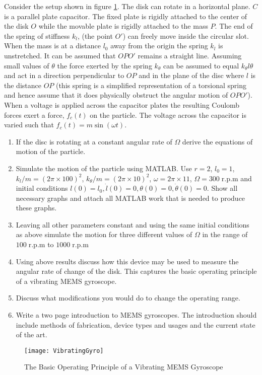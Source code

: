 \documentclass[graybox,envcountchap,sectrefs]{svmonoMuga}
\begin{document}
\begin{exercise}\label{ex:MEMSgyro}
Consider the setup shown in figure \ref{Fig:MEMSGyro}. The disk can rotate in a horizontal plane. $C$ is a parallel plate capacitor. The fixed plate is rigidly attached to the center of 
the disk $O$ while the movable plate is rigidly attached to the mass $P$. The end of the spring of stiffness $k_l$, (the point $O'$) can freely move inside the circular slot. When the 
mass is at a distance $l_0$ away from the origin the spring $k_l$ is unstretched. It can be assumed that $OPO'$ remains a straight line. Assuming small values of $\theta$ the force 
exerted by the spring $k_{\theta}$ can be assumed to equal $k_{\theta}l\theta$ and act in a direction perpendicular to $OP$ and in the plane of the disc where $l$ is the distance $OP
$ (this spring is a simplified representation of a torsional spring and hence assume that it does physically obstruct the angular motion of $OPO'$).
When a voltage is applied across the capacitor plates the resulting Coulomb forces exert a force, $f_c(t)$ on the particle. The voltage across the capacitor is varied such that 
$f_c(t)=m\sin{(\omega t)}$.

\begin{enumerate}
\item If the disc is rotating at a constant angular rate of $\Omega$ derive the equations of motion of the particle.
\item Simulate the motion of the particle using MATLAB. Use  $r=2$, $l_0=1$, $k_l/m=(2\pi\times 100)^2$, $k_{\theta}/m=(2\pi\times 10)^2$, $\omega=2\pi\times 11$, $\Omega=300\; 
\mathrm{r.p.m}$ and initial conditions $l(0)=l_0, \dot{l}(0)=0,
\theta(0)=0, \dot{\theta}(0)=0$. Show all necessary graphs and attach all MATLAB work that is needed to produce these graphs.
\item Leaving all other parameters constant and using the same initial conditions as above simulate the motion for three different values of $\Omega$ in the range of $100 \; 
\mathrm{r.p.m}$ to  $1000 \; \mathrm{r.p.m}$
\item Using above results discuss how this device may be used to measure the angular rate of change of the disk. This captures the basic operating principle of a vibrating MEMS 
gyroscope.
\item Discuss what modifications you would do to change the operating range.
\item Write a two page introduction to MEMS gyroscopes. The introduction should include methods of fabrication, device types and usages and the current state of the art.
\end{enumerate}
\begin{figure}[ht]
\begin{center}
\texttt{[image: VibratingGyro]}
\renewcommand{\baselinestretch}{1}\selectfont
\caption{The Basic Operating Principle of a Vibrating MEMS Gyroscope}
\label{Fig:MEMSGyro}
\renewcommand{\baselinestretch}{1.5}\selectfont
\end{center}
\end{figure}
\end{exercise}
\end{document}
